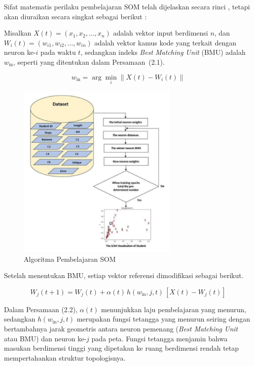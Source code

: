     Sifat matematis perilaku pembelajaran SOM telah dijelaskan secara rinci \citep{Cabanes2012}, \citep{Fuertes2010} tetapi akan diuraikan secara singkat sebagai berikut :

    Misalkan $X(t) = (x_1, x_2, \ldots, x_n)$ adalah vektor input berdimensi $n$, dan 
    $W_i(t) = (w_{i1}, w_{i2}, \ldots, w_{in})$ adalah vektor kamus kode yang terkait dengan neuron ke-$i$ pada waktu $t$, 
    sedangkan indeks \textit{Best Matching Unit} (BMU) adalah $w_{\text{in}}$, seperti yang ditentukan dalam Persamaan~(2.1).

    \[
        w_{\text{in}} = \arg \min_i \| X(t) - W_i(t) \|
    \]

    \begin{figure}[H]
        \centering
        \includegraphics[width=0.7\textwidth]{Gambar/gambar6.2.png}
        \caption{Algoritma Pembelajaran SOM}
    \end{figure}

    Setelah menentukan BMU, setiap vektor referensi dimodifikasi sebagai berikut.

    \[
        W_j(t + 1) = W_j(t) + \alpha(t) \, h(w_{\text{in}}, j, t) \, [X(t) - W_j(t)]
    \]

    Dalam Persamaan (2.2), $\alpha(t)$ menunjukkan laju pembelajaran yang menurun, sedangkan 
    $h(w_{\text{in}}, j, t)$ merupakan fungsi tetangga yang menurun seiring dengan bertambahnya jarak 
    geometris antara neuron pemenang (\textit{Best Matching Unit} atau BMU) dan neuron ke-$j$ pada peta. 
    Fungsi tetangga menjamin bahwa masukan berdimensi tinggi yang dipetakan ke ruang berdimensi rendah 
    tetap mempertahankan struktur topologisnya. 

